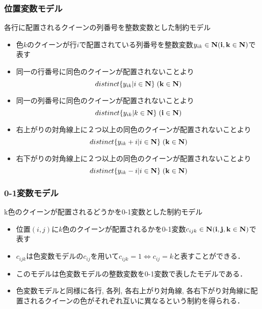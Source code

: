 \documentclass [dvipdfmx,12pt]{beamer}
\begin{document}
\begin{frame}
    \frametitle{位置変数モデル}
    {\small
        各行に配置される\alert{クイーンの列番号}を整数変数とした制約モデル
    }
    {\footnotesize
        \setlength{\abovedisplayskip}{1pt} %
        \setlength{\belowdisplayskip}{0pt} %
        \begin{block}{}
            \setlength{\itemsep}{0pt}
            \setlength{\parskip}{0pt}
            \begin{itemize}
                \item 色$k$のクイーンが行$i$で配置されている列番号を整数変数$y_{ik} \in \bf N (i, k \in \bf N)$で表す
                \item 同一の\alert{行番号}に同色のクイーンが配置されないことより
                    $$distinct\{y_{ik} | i \in \bf N\} \; (k \in \bf N)$$
                \item 同一の\alert{列番号}に同色のクイーンが配置されないことより
                    $$distinct\{y_{ik} | k \in \bf N\} \; (i \in \bf N)$$
                \item \alert{右上がりの対角線上}に２つ以上の同色のクイーンが配置されないことより
                    $$distinct\{y_{ik}+i | i \in \bf N\} \; (k \in \bf N)$$
                \item \alert{右下がりの対角線上}に２つ以上の同色のクイーンが配置されないことより
                    $$distinct\{y_{ik}-i | i \in \bf N\} \; (k \in \bf N)$$
            \end{itemize}
        \end{block}
    }
\end{frame}



\begin{frame}\small
    \frametitle{0-1変数モデル}
    \alert{k色のクイーンが配置されるどうか}を0-1変数とした制約モデル\\
    \setlength{\abovedisplayskip}{1pt} %
    \setlength{\belowdisplayskip}{1pt} %
    \begin{block}{}
        \begin{itemize}
            \item 位置$(i, j)$に$k$色のクイーンが配置されるかを0-1変数$c_{ijk} \in \bf N (i, j, k \in \bf N)$で表す
            \item $c_{ijk}$は色変数モデルの$c_{ij}$を用いて$c_{ijk}=1 \Leftrightarrow c_{ij}=k$と表すことができる．
            \item このモデルは色変数モデルの整数変数を0-1変数で表したモデルである．
            \item 色変数モデルと同様に\alert{各行}, \alert{各列}, \alert{各右上がり対角線}, \alert{各右下がり対角線}に配置されるクイーンの色がそれぞれ互いに異なるという制約を得られる．
        \end{itemize}
    \end{block}
\end{frame}
\end{document}
